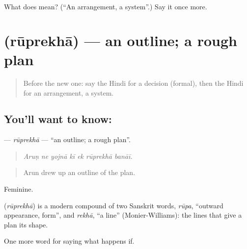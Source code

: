 \begin{tcolorbox}[breakable,colback=teal!4,colframe=teal!35!black,title={Before you move on}]
What does  mean? (\textquotedblleft{}An arrangement, a system\textquotedblright{}.) Say it once more.
\end{tcolorbox}
\section[\texorpdfstring{\hi{रूपरेखा} (rūprekhā)}{रूपरेखा (rūprekhā)}]{ (rūprekhā) — an outline; a rough plan}

\label{lesson:HI-C536-ruprekha}



\begin{quote}
Before the new one: say the Hindi for a decision (formal), then the Hindi for an arrangement, a system.
\end{quote}

\subsection*{You'll want to know: }
\textbf{} — \emph{rūprekhā} — \textquotedblleft{}an outline; a rough plan\textquotedblright{}.

\begin{quote}
      
\end{quote}

\begin{quote}
\emph{Aruṇ ne yojnā kī ek rūprekhā banāī.}
\end{quote}

\begin{quote}
Arun drew up an outline of the plan.
\end{quote}

Feminine.

\begin{cousinweb}
\textbf{} (\emph{rūprekhā}) is a modern compound of two Sanskrit words, \emph{rūpa}, \textquotedblleft{}outward appearance, form\textquotedblright{}, and \emph{rekhā}, \textquotedblleft{}a line\textquotedblright{} (Monier-Williams): the lines that give a plan its shape.
\end{cousinweb}

\begin{grammarlens}[title={What you've built}]
One more word for saying what happens if.
\end{grammarlens}

